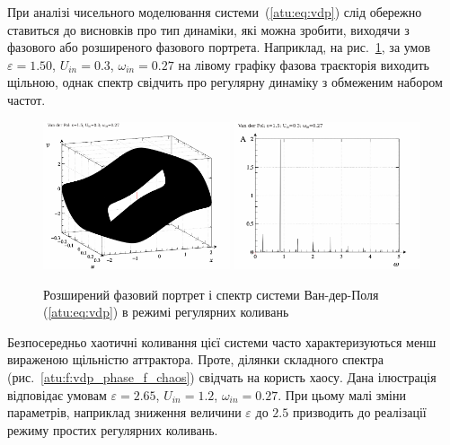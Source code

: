 При аналізі чисельного моделювання системи~(\ref{atu:eq:vdp})
слід обережно ставиться до висновків про тип динаміки, які
можна зробити, виходячи з фазового або розширеного фазового
портрета.
Наприклад, на рис.~\ref{atu:f:vdp_phase_f_reg}, за умов
$ \varepsilon = 1.50 $,
$ U_{in} = 0.3 $,
$ \omega_{in} = 0.27 $ на лівому графіку фазова траєкторія виходить
щільною, однак спектр свідчить про регулярну динаміку з
обмеженим набором частот.

\begin{figure}[ht!]
\begin{center}
  \includegraphics[width=0.49\textwidth]{p/cha/vdp/vdp_0-p_ph2d_1x50_0x30_0x27.png}
  \hfill
  \includegraphics[width=0.49\textwidth]{p/cha/vdp/vdp_fft-p_f_1x50_0x30_0x27.png}
\end{center}
\caption{Розширений фазовий портрет і спектр системи Ван-дер-Поля (\ref{atu:eq:vdp}) в режимі регулярних коливань}
\label{atu:f:vdp_phase_f_reg}
\end{figure}

Безпосередньо хаотичні коливання цієї системи часто
характеризуються менш вираженою щільністю аттрактора. Проте,
ділянки складного спектра (рис.~\ref{atu:f:vdp_phase_f_chaos}) свідчать на
користь хаосу. Дана ілюстрація відповідає умовам
$ \varepsilon = 2.65 $,
$ U_{in} = 1.2 $,
$ \omega_{in} = 0.27 $. При цьому малі зміни параметрів, наприклад зниження
величини
$ \varepsilon $ до
$ 2.5 $ призводить до реалізації режиму простих регулярних
коливань.

